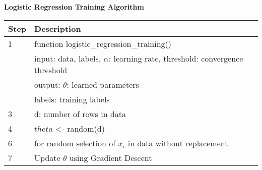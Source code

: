 \documentclass[preview]{standalone}
\begin{document}
\begin{table}[ht]
\centering
\textbf{Logistic Regression Training Algorithm} \\
\begin{tabular}{|l|l|}
\textbf{Step} & \textbf{Description} \\
\hline
1 & function logistic\_regression\_training() \\
  &  input: data, labels, $\alpha$: learning rate, threshold: convergence threshold \\
  &  output: $\theta$: learned parameters \\
  &  labels: training labels \\
3 &  d: number of rows in data \\
4 &  $theta$ <- random(d) \\
6 & \hspace{1cm} for random selection of $x_i$ in data without replacement \\ 
7 & \hspace{1cm} \hspace{1cm} Update $\theta$ using Gradient Descent \\ 
\hline
\end{tabular}
\end{table}
\end{document}
